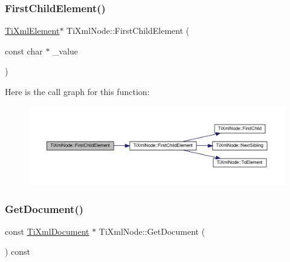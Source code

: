 \subsubsection{\texorpdfstring{First\+Child\+Element()}{FirstChildElement()}\hspace{0.1cm}{\footnotesize\ttfamily [4/4]}}
{\footnotesize\ttfamily \hyperlink{class_ti_xml_element}{Ti\+Xml\+Element}$\ast$ Ti\+Xml\+Node\+::\+First\+Child\+Element (\begin{DoxyParamCaption}\item[{const char $\ast$}]{\+\_\+value }\end{DoxyParamCaption})\hspace{0.3cm}{\ttfamily [inline]}}

Here is the call graph for this function\+:\nopagebreak
\begin{figure}[H]
\begin{center}
\leavevmode
\includegraphics[width=350pt]{class_ti_xml_node_a6936ae323675071808ac4840379e57f5_cgraph}
\end{center}
\end{figure}
\mbox{\label{class_ti_xml_node_adcb070acefcbaedaa0673d82e530538b}} 
\subsubsection{\texorpdfstring{Get\+Document()}{GetDocument()}\hspace{0.1cm}{\footnotesize\ttfamily [1/2]}}
{\footnotesize\ttfamily const \hyperlink{class_ti_xml_document}{Ti\+Xml\+Document} $\ast$ Ti\+Xml\+Node\+::\+Get\+Document (\begin{DoxyParamCaption}{ }\end{DoxyParamCaption}) const}

